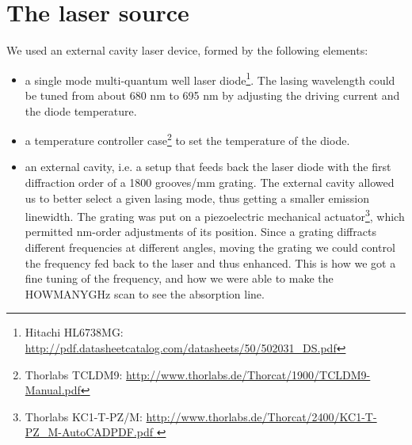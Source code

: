 \section{The laser source}\label{lasersource}
We used an external cavity laser device, formed by the following elements:
\begin{itemize}
\item a single mode multi-quantum well 
 laser diode\footnote{Hitachi HL6738MG: \url{http://pdf.datasheetcatalog.com/datasheets/50/502031_DS.pdf}}.
 The lasing wavelength could be tuned from about 680 nm to 695 nm by adjusting the driving current and the diode temperature.
\item a temperature controller case\footnote{Thorlabs TCLDM9: \url{http://www.thorlabs.de/Thorcat/1900/TCLDM9-Manual.pdf}} to set the temperature of the diode. 
\item an external cavity, i.e. a setup that feeds back the laser diode with the first diffraction order of a 1800 grooves/mm grating. The external cavity allowed us to better select a given lasing mode, thus getting a smaller emission linewidth. The grating was put on a piezoelectric mechanical actuator\footnote{Thorlabs KC1-T-PZ/M: \url{http://www.thorlabs.de/Thorcat/2400/KC1-T-PZ_M-AutoCADPDF.pdf }}, which permitted nm-order adjustments of its position. Since a grating diffracts different frequencies at different angles, moving the grating we could control the frequency fed back to the laser and thus enhanced. This is how we got a fine tuning of the frequency, and how we were able to make the HOWMANYGHz scan to see the absorption line. 
\end{itemize} 
